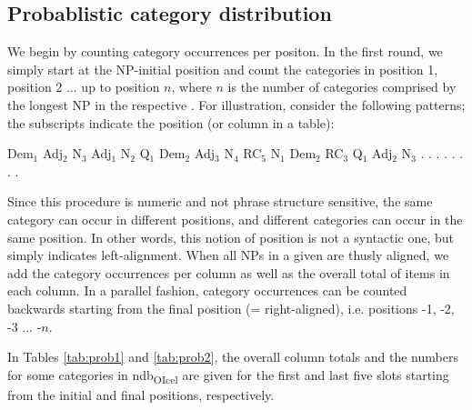 \documentclass[output=paper,colorlinks,citecolor=brown,draft]{langscibook}
\begin{document}
\subsection{Probablistic category distribution } 
\label{sec:proCaz}

We begin by counting category occurrences per positon. In the first round, we simply start at the NP-initial position and count the categories in position 1, position 2 ... up  to position $n$, where $n$ is the number of categories comprised by the longest NP in the respective . For illustration, consider the following patterns; the subscripts indicate the position (or column in a table):


\begin{exe}
    \ex 
    \begin{xlist}
        \ex Dem$_1$ Adj$_2$ N$_3$
        \ex Adj$_1$ N$_2$ 
        \ex Q$_1$ Dem$_2$ Adj$_3$ N$_4$ RC$_5$
        \ex N$_1$ Dem$_2$ RC$_3$
        \ex Q$_1$ Adj$_2$ N$_3$
        \ex . . . . . . . .
    \end{xlist}
\end{exe}

Since this procedure is numeric and not phrase structure sensitive, the same category can occur in different positions, and different categories can occur in the same position. In other words, this notion of position is not a syntactic one, but simply indicates left-alignment.  When all NPs in a given  are thusly aligned, we add the category occurrences per column as well as the overall total of items in each column. In a parallel fashion, category occurrences can be counted backwards starting from the final position (= right-aligned), i.e. positions -1,  -2, -3 ... -$n$. %

In Tables \ref{tab:prob1} and \ref{tab:prob2}, the overall column totals and the numbers for some categories in ndb\textsubscript{OIcel}  are given for the first and last five slots starting from the initial and final positions, respectively.
\end{document}
